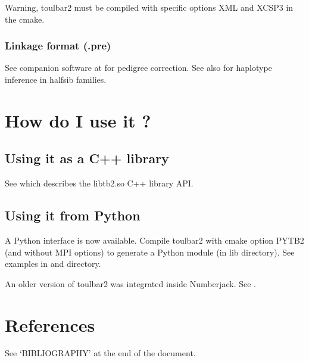 \documentclass[letterpaper,10pt,openany,oneside,english]{sphinxmanual}
\begin{document}
\sphinxAtStartPar
Warning, toulbar2 must be compiled with specific options XML and XCSP3 in the cmake.

\sphinxstepscope


\subsection{Linkage format (.pre)}
\label{\detokenize{formats/preformat:linkage-format-pre}}\label{\detokenize{formats/preformat:pre-format}}\label{\detokenize{formats/preformat::doc}}
\sphinxAtStartPar
See  companion software at  for pedigree correction. See also  for haplotype inference in half\sphinxhyphen{}sib families.


\chapter{How do I use it ?}
\label{\detokenize{userdoc:how-do-i-use-it}}

\section{Using it as a C++ library}
\label{\detokenize{userdoc:using-it-as-a-c-library}}
\sphinxAtStartPar
See  which describes the libtb2.so C++ library API.


\section{Using it from Python}
\label{\detokenize{userdoc:using-it-from-python}}
\sphinxAtStartPar
A Python interface is now available. Compile toulbar2 with cmake option PYTB2 (and without MPI options) to generate a Python module  (in lib directory). See examples in 
and  directory.

\sphinxAtStartPar
An older version of toulbar2 was integrated inside Numberjack. See .


\chapter{References}
\label{\detokenize{userdoc:references}}
\sphinxAtStartPar
See ‘BIBLIOGRAPHY’ at the end of the document.
\end{document}
